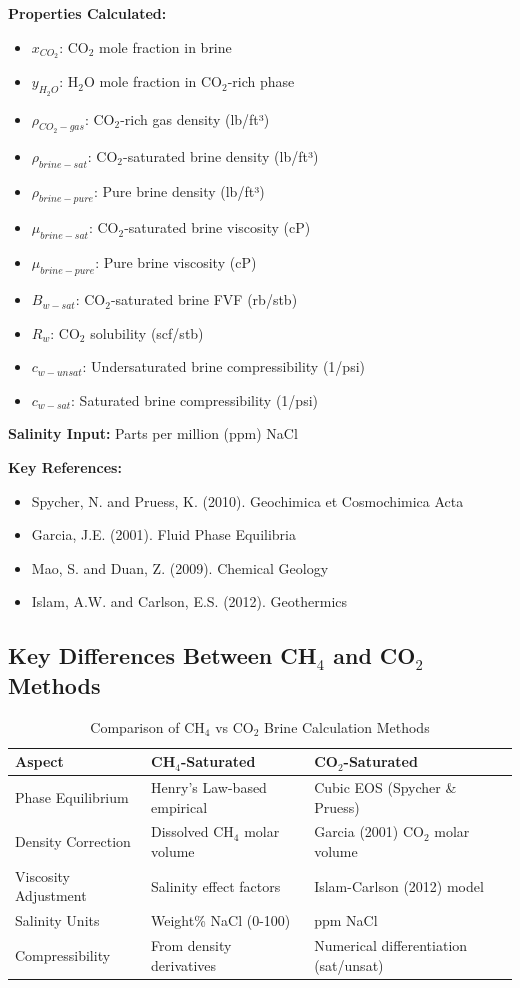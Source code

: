 \documentclass[11pt,a4paper]{article}
\newcommand{\symitem}[2]{\item \textbf{#1}: #2}
\begin{document}
\textbf{Properties Calculated:}
\begin{itemize}[leftmargin=2cm]
\symitem{$x_{CO_2}$}{CO$_2$ mole fraction in brine}
\symitem{$y_{H_2O}$}{H$_2$O mole fraction in CO$_2$-rich phase}
\symitem{$\rho_{CO_2-gas}$}{CO$_2$-rich gas density (lb/ft³)}
\symitem{$\rho_{brine-sat}$}{CO$_2$-saturated brine density (lb/ft³)}
\symitem{$\rho_{brine-pure}$}{Pure brine density (lb/ft³)}
\symitem{$\mu_{brine-sat}$}{CO$_2$-saturated brine viscosity (cP)}
\symitem{$\mu_{brine-pure}$}{Pure brine viscosity (cP)}
\symitem{$B_{w-sat}$}{CO$_2$-saturated brine FVF (rb/stb)}
\symitem{$R_w$}{CO$_2$ solubility (scf/stb)}
\symitem{$c_{w-unsat}$}{Undersaturated brine compressibility (1/psi)}
\symitem{$c_{w-sat}$}{Saturated brine compressibility (1/psi)}
\end{itemize}

\textbf{Salinity Input:} Parts per million (ppm) NaCl

\textbf{Key References:}
\begin{itemize}
\item Spycher, N. and Pruess, K. (2010). Geochimica et Cosmochimica Acta
\item Garcia, J.E. (2001). Fluid Phase Equilibria
\item Mao, S. and Duan, Z. (2009). Chemical Geology
\item Islam, A.W. and Carlson, E.S. (2012). Geothermics
\end{itemize}

\subsection{Key Differences Between CH$_4$ and CO$_2$ Methods}

\begin{table}[h]
\centering
\begin{tabular}{p{3cm}p{5cm}p{5cm}}
\toprule
\textbf{Aspect} & \textbf{CH$_4$-Saturated} & \textbf{CO$_2$-Saturated} \\
\midrule
Phase Equilibrium & Henry's Law-based empirical & Cubic EOS (Spycher \& Pruess) \\
Density Correction & Dissolved CH$_4$ molar volume & Garcia (2001) CO$_2$ molar volume \\
Viscosity Adjustment & Salinity effect factors & Islam-Carlson (2012) model \\
Salinity Units & Weight\% NaCl (0-100) & ppm NaCl \\
Compressibility & From density derivatives & Numerical differentiation (sat/unsat) \\
\bottomrule
\end{tabular}
\caption{Comparison of CH$_4$ vs CO$_2$ Brine Calculation Methods}
\end{table}
\end{document}

